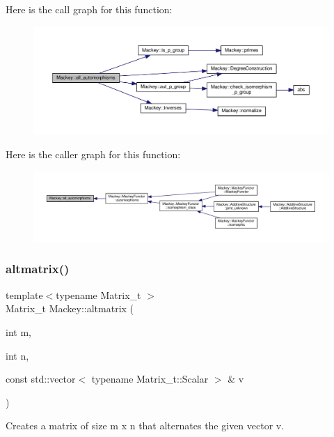 Here is the call graph for this function\+:\nopagebreak
\begin{figure}[H]
\begin{center}
\leavevmode
\includegraphics[width=350pt]{namespaceMackey_ac9020d176548a99b3119cd7bda15941d_cgraph}
\end{center}
\end{figure}
Here is the caller graph for this function\+:\nopagebreak
\begin{figure}[H]
\begin{center}
\leavevmode
\includegraphics[width=350pt]{namespaceMackey_ac9020d176548a99b3119cd7bda15941d_icgraph}
\end{center}
\end{figure}
\mbox{\label{namespaceMackey_a26a529f63caac9c5b4dc809e0e5831be}} 
\subsubsection{\texorpdfstring{altmatrix()}{altmatrix()}}
{\footnotesize\ttfamily template$<$typename Matrix\+\_\+t $>$ \\
Matrix\+\_\+t Mackey\+::altmatrix (\begin{DoxyParamCaption}\item[{int}]{m,  }\item[{int}]{n,  }\item[{const std\+::vector$<$ typename Matrix\+\_\+t\+::\+Scalar $>$ \&}]{v }\end{DoxyParamCaption})}



Creates a matrix of size m x n that alternates the given vector v. 

